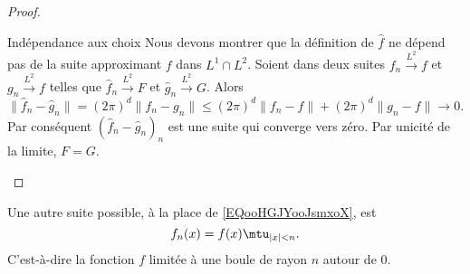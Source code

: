 \begin{proof}
\begin{subproof}
        \item[Indépendance aux choix]
            Nous devons montrer que la définition de \( \hat f\) ne dépend pas de la suite approximant \( f\) dans \( L^1\cap L^2\). Soient dans deux suites \( f_n\stackrel{L^2}{\longrightarrow}f\) et \( g_n\stackrel{L^2}{\longrightarrow}f\) telles que \( \hat f_n\stackrel{L^2}{\longrightarrow}F\) et \( \hat g_n\stackrel{L^2}{\longrightarrow}G\). Alors
            \begin{equation}
                \| \hat f_n-\hat g_n \|=(2\pi)^d\| f_n-g_n \|\leq (2\pi)^d\| f_n-f \|+(2\pi)^d\| g_n-f \|\to 0.
            \end{equation}
            Par conséquent \( (\hat f_n-\hat g_n)_n\) est une suite qui converge vers zéro. Par unicité de la limite, \( F=G\).
    \end{subproof}
\end{proof}

\begin{remark}
    Une autre suite possible, à la place de \eqref{EQooHGJYooJsmxoX}, est
    \begin{equation}
        f_n(x)=f(x)\mtu_{| x |<n}.
    \end{equation}
    C'est-à-dire la fonction \( f\) limitée à une boule de rayon \( n\) autour de \( 0\).
\end{remark}
